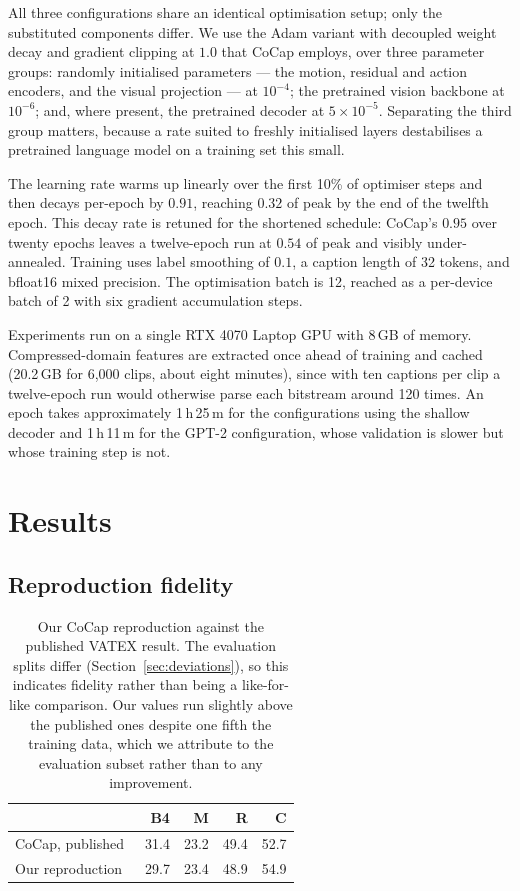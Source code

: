 \documentclass[10pt,twocolumn,letterpaper]{article}
\begin{document}
All three configurations share an identical optimisation setup; only the substituted components
differ. We use the Adam variant with decoupled weight decay and gradient clipping at $1.0$ that
CoCap employs, over three parameter groups: randomly initialised parameters --- the motion,
residual and action encoders, and the visual projection --- at $10^{-4}$; the pretrained vision
backbone at $10^{-6}$; and, where present, the pretrained decoder at $5\times10^{-5}$. Separating
the third group matters, because a rate suited to freshly initialised layers destabilises a
pretrained language model on a training set this small.

The learning rate warms up linearly over the first 10\% of optimiser steps and then decays
per-epoch by $0.91$, reaching $0.32$ of peak by the end of the twelfth epoch. This decay rate is
retuned for the shortened schedule: CoCap's $0.95$ over twenty epochs leaves a twelve-epoch run
at $0.54$ of peak and visibly under-annealed. Training uses label smoothing of $0.1$, a caption
length of 32 tokens, and bfloat16 mixed precision. The optimisation batch is 12, reached as a
per-device batch of 2 with six gradient accumulation steps.

Experiments run on a single RTX 4070 Laptop GPU with 8\,GB of memory. Compressed-domain features
are extracted once ahead of training and cached (20.2\,GB for 6,000 clips, about eight minutes),
since with ten captions per clip a twelve-epoch run would otherwise parse each bitstream around
120 times. An epoch takes approximately 1\,h\,25\,m for the configurations using the shallow
decoder and 1\,h\,11\,m for the GPT-2 configuration, whose validation is slower but whose
training step is not.

\section{Results}
\label{sec:results}

\subsection{Reproduction fidelity}

\begin{table}[t]
\centering\small
\begin{tabular}{lrrrr}
\toprule
& B4 & M & R & C \\
\midrule
CoCap, published~\cite{cocap} & 31.4 & 23.2 & 49.4 & 52.7 \\
Our reproduction              & 29.7 & 23.4 & 48.9 & 54.9 \\
\bottomrule
\end{tabular}
\caption{Our CoCap reproduction against the published VATEX result. The evaluation splits differ
(Section~\ref{sec:deviations}), so this indicates fidelity rather than being a like-for-like
comparison. Our values run slightly above the published ones despite one fifth the training
data, which we attribute to the evaluation subset rather than to any improvement.}
\label{tab:repro}
\end{table}
\end{document}
